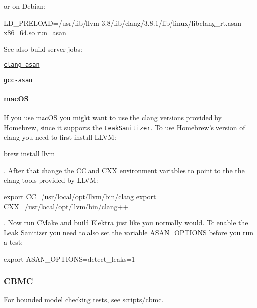 or on Debian\+: \begin{DoxyVerb}    LD_PRELOAD=/usr/lib/llvm-3.8/lib/clang/3.8.1/lib/linux/libclang_rt.asan-x86_64.so run_asan
\end{DoxyVerb}


See also build server jobs\+:


\begin{DoxyItemize}
\item \href{https://build.libelektra.org/job/elektra-clang-asan/}{\tt clang-\/asan}
\item \href{https://build.libelektra.org/job/elektra-gcc-asan/}{\tt gcc-\/asan}
\end{DoxyItemize}

\paragraph*{mac\+OS}

If you use mac\+OS you might want to use the {\ttfamily clang} versions provided by Homebrew, since it supports the \href{https://github.com/google/sanitizers/wiki/AddressSanitizerLeakSanitizer}{\tt Leak\+Sanitizer}. To use Homebrew’s version of {\ttfamily clang} you need to first install L\+L\+VM\+:


\begin{DoxyCode}
brew install llvm
\end{DoxyCode}


. After that change the {\ttfamily CC} and {\ttfamily C\+XX} environment variables to point to the the clang tools provided by L\+L\+VM\+:


\begin{DoxyCode}
export CC=/usr/local/opt/llvm/bin/clang
export CXX=/usr/local/opt/llvm/bin/clang++
\end{DoxyCode}


. Now run C\+Make and build Elektra just like you normally would. To enable the Leak Sanitizer you need to also set the variable {\ttfamily A\+S\+A\+N\+\_\+\+O\+P\+T\+I\+O\+NS} before you run a test\+:


\begin{DoxyCode}
export ASAN\_OPTIONS=detect\_leaks=1
\end{DoxyCode}


\subsubsection*{C\+B\+MC}

For bounded model checking tests, see {\ttfamily scripts/cbmc}.

